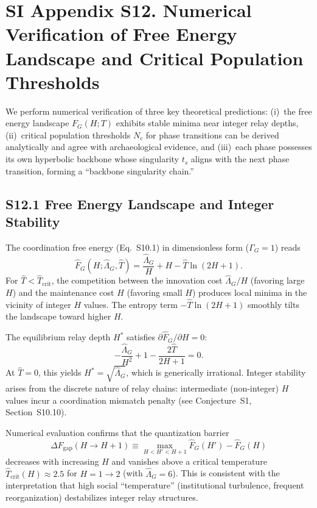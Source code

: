 \documentclass[11pt]{article}
\begin{document}
\section*{SI Appendix S12. Numerical Verification of Free Energy Landscape and Critical Population Thresholds}
\label{sec:S12_numerical}

We perform numerical verification of three key theoretical predictions: (i)~the free energy landscape $F_G(H;T)$ exhibits stable minima near integer relay depths, (ii)~critical population thresholds $N_c$ for phase transitions can be derived analytically and agree with archaeological evidence, and (iii)~each phase possesses its own hyperbolic backbone whose singularity $t_s$ aligns with the next phase transition, forming a ``backbone singularity chain.''

\subsection*{S12.1 Free Energy Landscape and Integer Stability}

The coordination free energy (Eq.~S10.1) in dimensionless form ($\Gamma_G = 1$) reads
\begin{equation}
  \hat{F}_G(H; \hat{\Lambda}_G, \hat{T}) = \frac{\hat{\Lambda}_G}{H} + H - \hat{T} \ln(2H+1).
  \label{eq:FG_dimensionless}
\end{equation}
For $\hat{T} < \hat{T}_{\mathrm{crit}}$, the competition between the innovation cost $\hat{\Lambda}_G / H$ (favoring large $H$) and the maintenance cost $H$ (favoring small $H$) produces local minima in the vicinity of integer $H$ values.  The entropy term $-\hat{T} \ln(2H+1)$ smoothly tilts the landscape toward higher $H$.

The equilibrium relay depth $H^*$ satisfies $\partial \hat{F}_G / \partial H = 0$:
\begin{equation}
  -\frac{\hat{\Lambda}_G}{H^2} + 1 - \frac{2\hat{T}}{2H+1} = 0.
  \label{eq:FG_extremum}
\end{equation}
At $\hat{T} = 0$, this yields $H^* = \sqrt{\hat{\Lambda}_G}$, which is generically irrational.  Integer stability arises from the discrete nature of relay chains: intermediate (non-integer) $H$ values incur a coordination mismatch penalty (see Conjecture~S1, Section~S10.10).

Numerical evaluation confirms that the quantization barrier
\begin{equation}
  \Delta F_{\mathrm{gap}}(H \to H{+}1) \equiv \max_{H < H' < H+1} \hat{F}_G(H') - \hat{F}_G(H)
\end{equation}
decreases with increasing $H$ and vanishes above a critical temperature $\hat{T}_{\mathrm{crit}}(H) \approx 2.5$ for $H = 1 \to 2$ (with $\hat{\Lambda}_G = 6$).  This is consistent with the interpretation that high social ``temperature'' (institutional turbulence, frequent reorganization) destabilizes integer relay structures.
\end{document}
